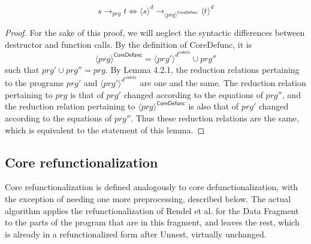 \begin{lemma}
\[
s \longrightarrow_{prg} t \iff \langle s \rangle^d \longrightarrow_{\langle prg \rangle^{\textsf{CoreDefunc}}} \langle t \rangle^d
\]

\begin{proof}
For the sake of this proof, we will neglect the syntactic differences between destructor and function calls. By the definition of \textsf{CoreDefunc}, it is
\[
\langle prg \rangle^{\textsf{CoreDefunc}} = \langle prg' \rangle^{d^{codata}} \cup prg''
\]
such that $prg' \cup prg'' = prg$. By Lemma 4.2.1, the reduction relations pertaining to the programs $prg'$ and $\langle prg' \rangle^{d^{codata}}$ are one and the same. The reduction relation pertaining to $prg$ is that of $prg'$ changed according to the equations of $prg''$, and the reduction relation pertaining to $\langle prg \rangle^{\textsf{CoreDefunc}}$ is also that of $prg'$ changed according to the equations of $prg''$. Thus these reduction relations are the same, which is equivalent to the statement of this lemma.
\end{proof}
\end{lemma}

\subsection{Core refunctionalization}

Core refunctionalization is defined analogously to core defunctionalization, with the exception of needing one more preprocessing, described below. The actual algorithm applies the refunctionalization of Rendel et al. for the Data Fragment to the parts of the program that are in this fragment, and leaves the rest, which is already in a refunctionalized form after \textsf{Unnest}, virtually unchanged. 

